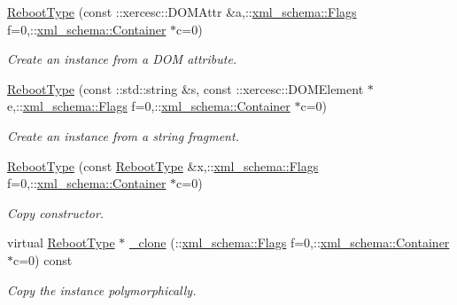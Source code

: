 \begin{DoxyCompactItemize}
\hyperlink{classopenstack_1_1xml_1_1RebootType_af215e4c7ab920a2a32a0e949e43f12ce}{RebootType} (const ::xercesc::DOMAttr \&a,::\hyperlink{namespacexml__schema_affb4c227cbd9aa7453dd1dc5a1401943}{xml\_\-schema::Flags} f=0,::\hyperlink{namespacexml__schema_a333dea2213742aea47a37532dec4ec27}{xml\_\-schema::Container} $\ast$c=0)
\begin{DoxyCompactList}\small\item\em Create an instance from a DOM attribute. \item\end{DoxyCompactList}\item 
\hyperlink{classopenstack_1_1xml_1_1RebootType_a82db8d193cd73f2c6e37a483cbfaed87}{RebootType} (const ::std::string \&s, const ::xercesc::DOMElement $\ast$e,::\hyperlink{namespacexml__schema_affb4c227cbd9aa7453dd1dc5a1401943}{xml\_\-schema::Flags} f=0,::\hyperlink{namespacexml__schema_a333dea2213742aea47a37532dec4ec27}{xml\_\-schema::Container} $\ast$c=0)
\begin{DoxyCompactList}\small\item\em Create an instance from a string fragment. \item\end{DoxyCompactList}\item 
\hyperlink{classopenstack_1_1xml_1_1RebootType_a1d4887d785825779f7a99103f357c8c9}{RebootType} (const \hyperlink{classopenstack_1_1xml_1_1RebootType}{RebootType} \&x,::\hyperlink{namespacexml__schema_affb4c227cbd9aa7453dd1dc5a1401943}{xml\_\-schema::Flags} f=0,::\hyperlink{namespacexml__schema_a333dea2213742aea47a37532dec4ec27}{xml\_\-schema::Container} $\ast$c=0)
\begin{DoxyCompactList}\small\item\em Copy constructor. \item\end{DoxyCompactList}\item 
virtual \hyperlink{classopenstack_1_1xml_1_1RebootType}{RebootType} $\ast$ \hyperlink{classopenstack_1_1xml_1_1RebootType_ad6101630c2fce31e10f05e67762e2f35}{\_\-clone} (::\hyperlink{namespacexml__schema_affb4c227cbd9aa7453dd1dc5a1401943}{xml\_\-schema::Flags} f=0,::\hyperlink{namespacexml__schema_a333dea2213742aea47a37532dec4ec27}{xml\_\-schema::Container} $\ast$c=0) const 
\begin{DoxyCompactList}\small\item\em Copy the instance polymorphically. \item\end{DoxyCompactList}\item 

\end{DoxyCompactItemize}
